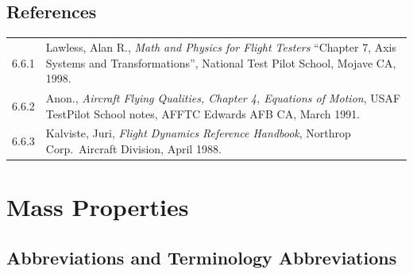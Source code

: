 \documentclass[
]{book}
\begin{document}
\hypertarget{references}{%
\section{References}\label{references}}

\begin{longtable}[]{@{}ll@{}}
\toprule
\endhead
\begin{minipage}[t]{0.06\columnwidth}\raggedright
6.6.1\strut
\end{minipage} & \begin{minipage}[t]{0.88\columnwidth}\raggedright
Lawless, Alan R., \emph{Math and Physics for Flight Testers} ``Chapter 7, Axis Systems and Transformations'', National Test Pilot School, Mojave CA, 1998.\strut
\end{minipage}\tabularnewline
\begin{minipage}[t]{0.06\columnwidth}\raggedright
6.6.2\strut
\end{minipage} & \begin{minipage}[t]{0.88\columnwidth}\raggedright
Anon., \emph{Aircraft Flying Qualities, Chapter 4, Equations of Motion}, USAF TestPilot School notes, AFFTC Edwards AFB CA, March 1991.\strut
\end{minipage}\tabularnewline
\begin{minipage}[t]{0.06\columnwidth}\raggedright
6.6.3\strut
\end{minipage} & \begin{minipage}[t]{0.88\columnwidth}\raggedright
Kalviste, Juri, \emph{Flight Dynamics Reference Handbook}, Northrop Corp.~Aircraft Division, April 1988.\strut
\end{minipage}\tabularnewline
\bottomrule
\end{longtable}

\hypertarget{mass-properties}{%
\chapter{Mass Properties}\label{mass-properties}}

\hypertarget{abbreviations-and-terminology-abbreviations}{%
\section{Abbreviations and Terminology Abbreviations}\label{abbreviations-and-terminology-abbreviations}}
\end{document}
